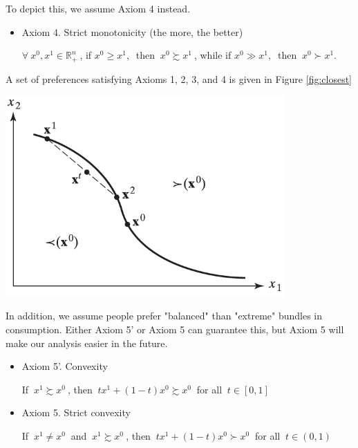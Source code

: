 \documentclass{article}
\newcommand{\R}{\mathbb{R}}
\begin{document}
\begin{mdframed}[backgroundcolor=blue!20,linecolor=white]
To depict this, we assume Axiom 4 instead.

\begin{itemize}
\item Axiom 4. Strict monotonicity (the more, the better)

$\forall \ x^0, x^1 \in \R^n_+ \ $, if $x^0 \ge x^1, \ $ then  $\ x^0 \succsim x^1 \ $, while if 
$x^0 \gg x^1, \ $ then  $\ x^0 \succ x^1$.
\end{itemize}

A set of preferences satisfying Axioms 1, 2, 3, and 4 is given in Figure \ref{fig:closest}
\vspace{2mm}

{\centering
\includegraphics[width=0.8\textwidth]{1.closest}
\label{fig:closest}}
\vspace{2mm}

In addition, we assume people prefer "balanced" than "extreme" bundles in consumption.
Either Axiom 5' or Axiom 5 can guarantee this, but Axiom 5 will make our analysis easier in the future.

\begin{itemize}

\item Axiom 5'. Convexity

If $\ x^1 \succsim x^0 \ $, then $\ tx^1 + (1-t)x^0 \succsim x^0 \ $ for all $\ t \in [0,1]$

\item Axiom 5. Strict convexity

If $\ x^1 \ne x^0 \ $ and $\ x^1 \succsim x^0 \ $, then $\ tx^1 + (1-t)x^0 \succ x^0 \ $ for all $\ t \in (0,1)$

\end{itemize}


\end{mdframed}
\end{document}
